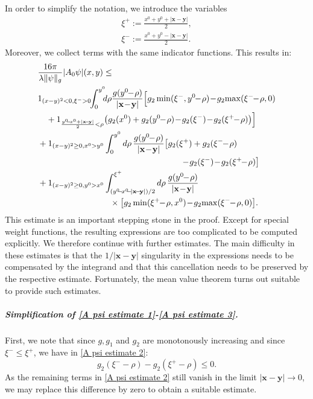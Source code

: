 \documentclass[b5paper,draft,openbib,12pt]{memoir}
\newcommand{\vx}{\mathbf{x}}
\newcommand{\vy}{\mathbf{y}}
\begin{document}
In order to simplify the notation, we introduce the 
variables
\begin{align}
    \xi^+:=\frac{x^0+y^0+|\vx-\vy|}{2},\\
    \xi^-:=\frac{x^0+y^0-|\vx-\vy|}{2}.
\end{align}
Moreover, we collect terms with the same indicator 
functions. This results in:
\begin{align}
    &\frac{16\pi}{\lambda\|\psi\|_g}|A_0\psi|(x,y)\le\notag\\
    &1_{(x-y)^2<0,\xi^->0} \!\!\int_0^{y^0}\!\!\!d\rho  \frac{g(y^0\!\!-\!\rho)}{|\vx\!-\!\vy|}
    \Big[g_2\min(\xi^-,y^0\!\!-\!\rho)\!-\!g_2\!\max(\xi^-\!\!-\!\rho,0)
    \notag\\\label{A psi estimate 1}
    &\quad + 1_{\frac{y^0\!\!-\!x^0+|\vx\!-\!\vy|}{2}<\rho} \big(g_2(x^0)+g_2(y^0\!\!-\!\rho)
    \!-\!g_2(\xi^-)\!-\!g_2(\xi^+\!\!-\!\rho)\big)
    \Big]\\\label{A psi estimate 2}
    &+1_{(x-y)^2\ge0,x^0>y^0}\int_0^{y^0} d\rho \, \frac{g(y^0\!\!-\!\rho)}{|\vx\!-\!\vy|} \big[g_2(\xi^+)+g_2(\xi^-\!\!-\!\rho)\notag\\
    &\hspace{6cm} \!-\! g_2(\xi^-)\!-\!g_2(\xi^+\!\!-\!\rho)\big]\\\label{A psi estimate 3}
    &+1_{(x-y)^2\ge0,y^0>x^0}\int_{(y^0\!\!-\!x^0\!\!-\!|\vx\!-\!\vy|)/2}^{\xi^+}d\rho \, \frac{g(y^0\!\!-\!\rho)}{|\vx\!-\!\vy|}\notag\\
    &\hspace{3cm}\times \big[g_2\min(\xi^+\!\!-\!\rho,x^0) \!-\! g_2\!\max(\xi^-\!\!-\!\rho,0)\big].
\end{align}
This estimate is an important stepping stone in the proof. Except for special weight functions, the resulting expressions are too complicated to be computed explicitly. We therefore continue with further estimates. The main difficulty in these estimates is that the $1/|\vx-\vy|$ singularity in the expressions needs to be compensated by the integrand and that this cancellation needs to be preserved by the respective estimate. Fortunately, the mean value theorem turns out suitable to provide such estimates.


\subparagraph{Simplification of 
\eqref{A psi estimate 1}-\eqref{A psi estimate 3}.}
First, we note that since $g, g_1$ and $g_2$ are monotonously increasing and 
since $\xi^- \leq \xi^+$, we have in \eqref{A psi estimate 2}:
\begin{equation}
	g_2(\xi^- - \rho) - g_2(\xi^+ - \rho) \leq 0.
\end{equation}
As the remaining terms in \eqref{A psi estimate 2} still vanish in the limit 
$|\vx-\vy| \rightarrow 0$, we may replace this difference by zero to obtain a 
suitable estimate.
\end{document}
